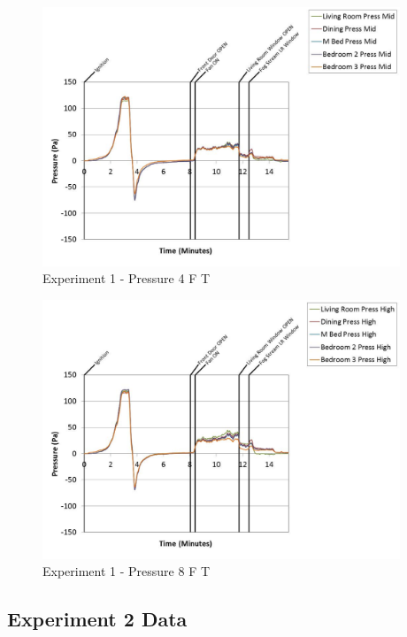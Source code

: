 \documentclass{article}
\begin{document}
\begin{appendices}
	\begin{figure}[h!]
		\centering
		\includegraphics[height=3.05in]{0_Images/Results_Charts/Exp_1_Charts/Pressure4FT.pdf}
		\caption{Experiment 1 - Pressure 4 F T}
	\end{figure}
 
	\clearpage

	\begin{figure}[h!]
		\centering
		\includegraphics[height=3.05in]{0_Images/Results_Charts/Exp_1_Charts/Pressure8FT.pdf}
		\caption{Experiment 1 - Pressure 8 F T}
	\end{figure}
 

		\clearpage
\clearpage		\large
\subsection{Experiment 2 Data} \label{App:Exp2Results} 


\end{appendices}
\end{document}
